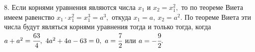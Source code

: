 8. Если корнями уравнения являются числа $x_1$ и $x_2=x_1^2,$ то по теореме Виета имеем равенство $x_1\cdot x_1^2=x_1^3=a^3,$ откуда $x_1=a,\ x_2=a^2.$ По теореме Виета эти числа будут являться корнями уравнения тогда и только тогда, когда $a+a^2=\cfrac{63}{4},\ 4a^2+4a-63=0,\ a=\cfrac{7}{2}$ или $a=-\cfrac{9}{2}.$\\
